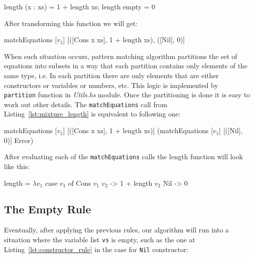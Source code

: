\documentclass[12pt,a4paper]{report}
\begin{document}
\vspace*{0.2in}
\begin{code}
length (x : xs) = 1 + length xs;
length empty = 0
\end{code}

After transforming this function we will get:

\vspace*{0.2in}
\begin{code}[style=haskell,label=lst:mixture_length, mathescape=true,
  caption={Mixture rule application.}]
matchEquations [$v_{1}$]
               [([Cons x xs], 1 + length xs),
                ([Nil], 0)]
\end{code}

When such situation occurs, pattern matching algorithm partitions the set of
equations into subsets in a way that each partition contains only elements of
the same type, i.e. In each partition there are only elements that are either
constructors or variables or numbers, etc. This logic is implemented by
\texttt{partition} function in \textit{Utils.hs} module. Once the partitioning
is done it is easy to work out other details. The \texttt{matchEquations} call
from Listing~\ref{lst:mixture_length} is equivalent to following one:

\vspace*{0.2in}
\begin{code}[style=haskell,mathescape=true]
matchEquations [$v_{1}$]
               [([Cons x xs], 1 + length xs)]
               (matchEquations [$v_{1}$]
                               [([Nil], 0)]
                               Error)
\end{code}

After evaluating each of the \texttt{matchEquations} calls the length function
will look like this:

\vspace*{0.2in}
\begin{code}[style=haskell,mathescape=true]
length = $\lambda v_{1}$
    case $v_{1}$ of
        Cons $v_{1}$ $v_{2}$ -> 1 + length $v_{2}$
        Nil       -> 0
\end{code}

\subsection{The Empty Rule}
Eventually, after applying the previous rules, our algorithm will run into a
situation where the variable list \texttt{vs} is empty, such as the one at
Listing~\ref{lst:constructor_rule} in the case for \texttt{Nil} constructor:
\end{document}
